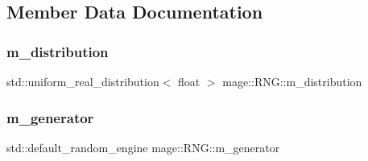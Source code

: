 \subsection{Member Data Documentation}
\hypertarget{classmage_1_1_r_n_g_af0f87b95305e05fd560911e0068e6498}{}\label{classmage_1_1_r_n_g_af0f87b95305e05fd560911e0068e6498} 
\subsubsection{\texorpdfstring{m\+\_\+distribution}{m\_distribution}}
{\footnotesize\ttfamily std\+::uniform\+\_\+real\+\_\+distribution$<$ float $>$ mage\+::\+R\+N\+G\+::m\+\_\+distribution\hspace{0.3cm}{\ttfamily [private]}}

\hypertarget{classmage_1_1_r_n_g_a43dc452c2e32d468fa42d16e02d3a283}{}\label{classmage_1_1_r_n_g_a43dc452c2e32d468fa42d16e02d3a283} 
\subsubsection{\texorpdfstring{m\+\_\+generator}{m\_generator}}
{\footnotesize\ttfamily std\+::default\+\_\+random\+\_\+engine mage\+::\+R\+N\+G\+::m\+\_\+generator\hspace{0.3cm}{\ttfamily [private]}}

